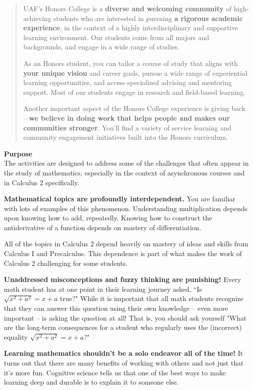 \documentclass[12pt]{article}
\renewcommand{\emph}[1]{\textsf{\textbf{#1}}}
\newcommand{\localhead}[1]{\par\smallskip\textbf{#1} \smallskip\nobreak\\}%
\def\heading#1{\localhead{\large\emph{#1}}}
\begin{document}
\begin{quote} 
UAF's Honors College is a \textbf{diverse and welcoming community} of high-achieving students who are interested in pursuing \textbf{a rigorous academic experience}, in the context of a highly interdisciplinary and supportive learning environment. Our students come from all majors and backgrounds, and engage in a wide range of studies.

As an Honors student, you can tailor a course of study that aligns with \textbf{your unique vision} and career goals, pursue a wide range of experiential learning opportunities, and access specialized advising and mentoring support. Most of our students engage in research and field-based learning.

Another important aspect of the Honors College experience is {giving back} -- \textbf{we believe in doing work that helps people and makes our communities stronger}. You'll find a variety of  {service learning and community engagement} initiatives built into the Honors curriculum.
\end{quote}

\heading{Purpose}
The activities are designed to address some of the challenges that often appear in the study of mathematics, especially in the context of asynchronous courses and in Calculus 2 specifically.

\textbf{Mathematical topics are profoundly interdependent.} You are familiar with lots of examples of this phenomenon. Understanding multiplication depends upon knowing how to add, repeatedly. Knowing how to construct the antiderivative of a function depends on mastery of differentiation. 

All of the topics in Calculus 2 depend heavily on mastery of ideas and skills from Calculus I and Precalculus. This dependence is part of what makes the work of Calculus 2 challenging for some students.

\textbf{Unaddressed misconceptions and fuzzy thinking are punishing!}  Every math student has at one point in their learning journey asked, ``Is $\sqrt{x^2+a^2}=x+a$ true?" While it is important that all math students recognize that they can answer this question using their own knowledge -- even more important -- is asking the question at all! That is, you should ask yourself "What are the long-term consequences for a student who regularly uses the (incorrect) equality $\sqrt{x^2+a^2}=x+a$?"

\textbf{Learning mathematics shouldn't be a solo endeavor all of the time!} It turns out that there are many benefits of working with others and not just that it's more fun. Cognitive science tells us that one of the best ways to make learning deep and durable is to explain it to someone else. 
\end{document}
